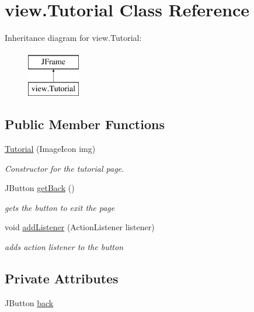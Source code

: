 \hypertarget{classview_1_1_tutorial}{}\section{view.\+Tutorial Class Reference}
\label{classview_1_1_tutorial}
Inheritance diagram for view.\+Tutorial\+:\begin{figure}[H]
\begin{center}
\leavevmode
\includegraphics[height=2.000000cm]{classview_1_1_tutorial}
\end{center}
\end{figure}
\subsection*{Public Member Functions}
\begin{DoxyCompactItemize}
\item 
\hyperlink{classview_1_1_tutorial_a0b4dd05d8cf555062780668eb39b9c10}{Tutorial} (Image\+Icon img)
\begin{DoxyCompactList}\small\item\em Constructor for the tutorial page. \end{DoxyCompactList}\item 
J\+Button \hyperlink{classview_1_1_tutorial_a612e0c4badab0a67e6e79364552b452b}{get\+Back} ()
\begin{DoxyCompactList}\small\item\em gets the button to exit the page \end{DoxyCompactList}\item 
void \hyperlink{classview_1_1_tutorial_ab7c6fa062c2541f1b02f1c31f8043811}{add\+Listener} (Action\+Listener listener)
\begin{DoxyCompactList}\small\item\em adds action listener to the button \end{DoxyCompactList}\end{DoxyCompactItemize}
\subsection*{Private Attributes}
\begin{DoxyCompactItemize}
\item 
J\+Button \hyperlink{classview_1_1_tutorial_a9b4a9e5388de99525cc3a982a606ea84}{back}
\end{DoxyCompactItemize}


